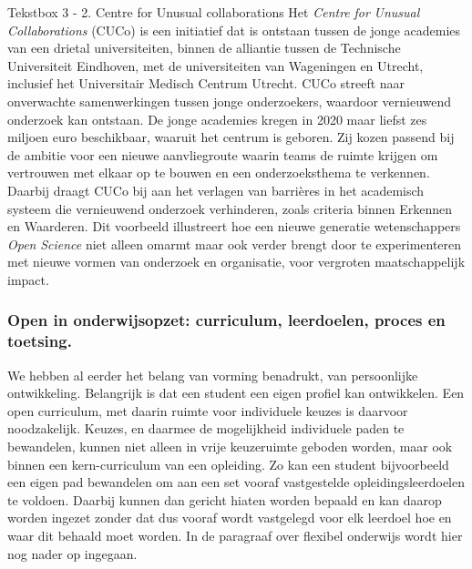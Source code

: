 \documentclass[smallauthor, chapterhaspagenum, nochapterinheader, pagenuminheader,  bigchapnum,medium2, tocpages,  garamond, titleinheader]{jote-book}
\begin{document}
	\begin{bookbox}{Tekstbox 3 - 2. Centre for Unusual collaborations}
		Het \emph{Centre }\emph{for}\emph{ }\emph{Unusual}\emph{ }\emph{Collaborations} (CUCo) is een initiatief dat is ontstaan tussen de jonge academies van een drietal universiteiten, binnen de alliantie tussen de Technische Universiteit Eindhoven, met de universiteiten van Wageningen en Utrecht, inclusief het Universitair Medisch Centrum Utrecht. CUCo streeft naar onverwachte samenwerkingen tussen jonge onderzoekers, waardoor vernieuwend onderzoek kan ontstaan. De jonge academies kregen in 2020 maar liefst zes miljoen euro beschikbaar, waaruit het centrum is geboren. Zij kozen passend bij de ambitie voor een nieuwe aanvliegroute waarin teams de ruimte krijgen om vertrouwen met elkaar op te bouwen en een onderzoeksthema te verkennen. Daarbij draagt CUCo bij aan het verlagen van barrières in het academisch systeem die vernieuwend onderzoek verhinderen, zoals criteria binnen Erkennen en Waarderen. Dit voorbeeld illustreert hoe een nieuwe generatie wetenschappers \emph{Open }\emph{Science} niet alleen omarmt maar ook verder brengt door te experimenteren met nieuwe vormen van onderzoek en organisatie, voor vergroten maatschappelijk impact.
	\end{bookbox}

	\subsubsection{Open in onderwijsopzet: curriculum, leerdoelen, proces en toetsing. }



	We hebben al eerder het belang van vorming benadrukt, van persoonlijke ontwikkeling. Belangrijk is dat een student een eigen profiel kan ontwikkelen. Een open curriculum, met daarin ruimte voor individuele keuzes is daarvoor noodzakelijk. Keuzes, en daarmee de mogelijkheid individuele paden te bewandelen, kunnen niet alleen in vrije keuzeruimte geboden worden, maar ook binnen een kern-curriculum van een opleiding. Zo kan een student bijvoorbeeld een eigen pad bewandelen om aan een set vooraf vastgestelde opleidingsleerdoelen te voldoen. Daarbij kunnen dan gericht hiaten worden bepaald en kan daarop worden ingezet zonder dat dus vooraf wordt vastgelegd voor elk leerdoel hoe en waar dit behaald moet worden. In de paragraaf over flexibel onderwijs wordt hier nog nader op ingegaan.
\end{document}
